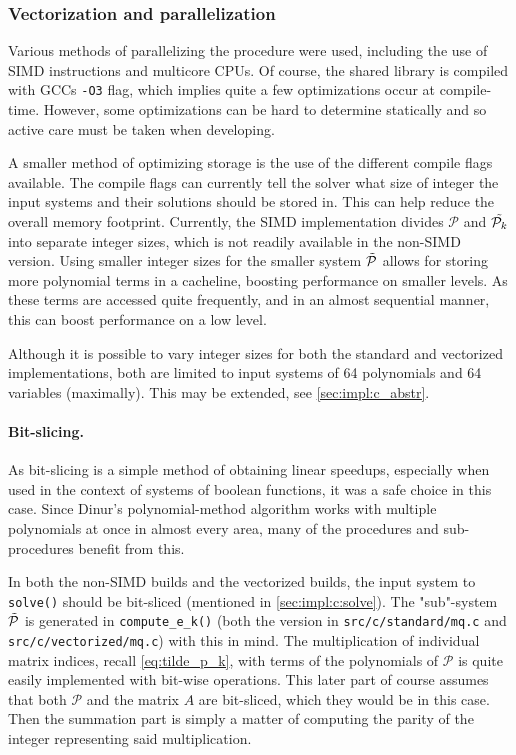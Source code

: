\subsubsection{Vectorization and parallelization} \label{sec:impl:opt:parallel}
Various methods of parallelizing the procedure were used, including the use of SIMD instructions and multicore CPUs. Of course, the shared library is compiled with GCCs \texttt{-O3} flag, which implies quite a few optimizations occur at compile-time. However, some optimizations can be hard to determine statically and so active care must be taken when developing. 

A smaller method of optimizing storage is the use of the different compile flags available. The compile flags can currently tell the solver what size of integer the input systems and their solutions should be stored in. This can help reduce the overall memory footprint. Currently, the SIMD implementation divides $\mathcal{P}$ and $\Tilde{\mathcal{P}_k}$ into separate integer sizes, which is not readily available in the non-SIMD version. Using smaller integer sizes for the smaller system $\Tilde{\mathcal{P}}$ allows for storing more polynomial terms in a cacheline, boosting performance on smaller levels. As these terms are accessed quite frequently, and in an almost sequential manner, this can boost performance on a low level.

Although it is possible to vary integer sizes for both the standard and vectorized implementations, both are limited to input systems of 64 polynomials and 64 variables (maximally). This may be extended, see \cref{sec:impl:c_abstr}.

\paragraph{Bit-slicing.} As bit-slicing is a simple method of obtaining linear speedups, especially when used in the context of systems of boolean functions, it was a safe choice in this case. Since Dinur's polynomial-method algorithm works with multiple polynomials at once in almost every area, many of the procedures and sub-procedures benefit from this.

In both the non-SIMD builds and the vectorized builds, the input system to \texttt{solve()} should be bit-sliced (mentioned in \cref{sec:impl:c:solve}). The "sub"-system $\Tilde{\mathcal{P}}$ is generated in \texttt{compute\_e\_k()} (both the version in \texttt{src/c/standard/mq.c} and \texttt{src/c/vectorized/mq.c}) with this in mind. The multiplication of individual matrix indices, recall \cref{eq:tilde_p_k}, with terms of the polynomials of $\mathcal{P}$ is quite easily implemented with bit-wise operations. This later part of course assumes that both $\mathcal{P}$ and the matrix $A$ are bit-sliced, which they would be in this case. Then the summation part is simply a matter of computing the parity of the integer representing said multiplication. 

